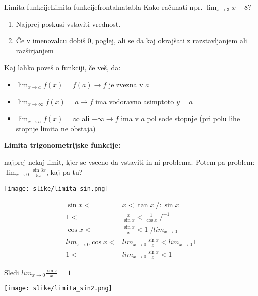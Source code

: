 \begin{priprava}{}{}{Limita funkcije}{Limita funkcije}{frontalna}{tabla}
Kako računati npr. $ \lim_{x \to 3} x + 8 $?
\begin{enumerate}
    \item Najprej poskusi vstaviti vrednost.
    \item Če v imenovalcu dobiš 0, poglej, ali se da kaj okrajšati z razstavljanjem ali razširjanjem
\end{enumerate}


Kaj lahko poveš o funkciji, če veš, da: 
\begin{itemize}
    \item $ \lim_{x \to a} f(x) = f(a) \to f $ je zvezna v $ a $
    \item $ \lim_{x \to \infty} f(x) = a \to f $ ima vodoravno asimptoto $ y = a $ 
    \item $ \lim_{x \to a} f(x) = \infty $ ali $ - \infty \rightarrow f $ ima v $ a $ pol sode stopnje (pri polu lihe stopnje limita ne obstaja)
\end{itemize}
    
\textbf{Limita trigonometrijske funkcije:}

najprej nekaj limit, kjer se vseeno da vstaviti in ni problema. Potem pa problem: $ \lim_{x \to 0} \frac{\sin {3x}}{5x} $, kaj pa tu?

\begin{figure*}[h]
    \centering
    \texttt{[image: slike/limita\_sin.png]}
\end{figure*}

\newpage

\begin{align*}
    \sin x < & x < \tan x \; / : \sin x \\
    1 < & \frac{x}{\sin x} < \frac{1}{\cos x} \; / ^{-1} \\
    \cos x < & \frac{\sin x}{x} < 1 \; / lim_{x \to 0} \\
    lim_{x \to 0} \cos x < & lim_{x \to 0} \frac{\sin x}{x} < lim_{x \to 0} 1 \\
    1 < & lim_{x \to 0} \frac{\sin x}{x} < 1
\end{align*}

Sledi $ lim_{x \to 0} \frac{\sin x}{x} = 1 $ 

\begin{figure*}[h]
    \centering
    \texttt{[image: slike/limita\_sin2.png]}
\end{figure*}

\end{priprava}